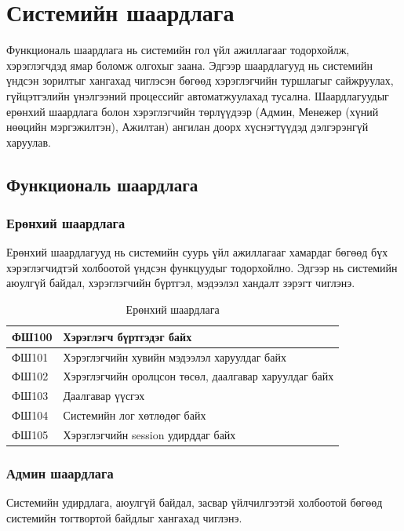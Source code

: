 \section{Системийн шаардлага}

Функциональ шаардлага нь системийн гол үйл ажиллагааг тодорхойлж, хэрэглэгчдэд ямар боломж олгохыг заана.
Эдгээр шаардлагууд нь системийн үндсэн зорилтыг хангахад чиглэсэн бөгөөд хэрэглэгчийн туршлагыг сайжруулах,
гүйцэтгэлийн үнэлгээний процессийг автоматжуулахад тусална. Шаардлагуудыг ерөнхий шаардлага болон хэрэглэгчийн
төрлүүдээр (Админ, Менежер (хүний нөөцийн мэргэжилтэн), Ажилтан) ангилан доорх хүснэгтүүдэд дэлгэрэнгүй харуулав.

\subsection{Функциональ шаардлага}
\subsubsection{Ерөнхий шаардлага}
Ерөнхий шаардлагууд нь системийн суурь үйл ажиллагааг хамардаг бөгөөд бүх хэрэглэгчидтэй холбоотой үндсэн 
функцуудыг тодорхойлно. Эдгээр нь системийн аюулгүй байдал, хэрэглэгчийн бүртгэл, мэдээлэл хандалт зэрэгт чиглэнэ.

\begin{table}[H]
    \centering
    \label{my-label-1}
    \begin{tabular}{|p{1.7cm}|p{12cm}|}
        \hline
          ФШ100 & Хэрэглэгч бүртгэдэг байх\\\hline
          ФШ101 & Хэрэглэгчийн хувийн мэдээлэл харуулдаг байх\\ \hline
          ФШ102 & Хэрэглэгчийн оролцсон төсөл, даалгавар харуулдаг байх \\\hline
          ФШ103 & Даалгавар үүсгэх \\ \hline
          ФШ104 & Системийн лог хөтлөдөг байх\\ \hline
          ФШ105 & Хэрэглэгчийн session удирддаг байх \\ \hline
    \end{tabular}
    \caption{Ерөнхий шаардлага}
\end{table}

\subsubsection{Админ шаардлага}
Системийн удирдлага, аюулгүй байдал, засвар үйлчилгээтэй холбоотой бөгөөд системийн тогтвортой байдлыг хангахад чиглэнэ.

